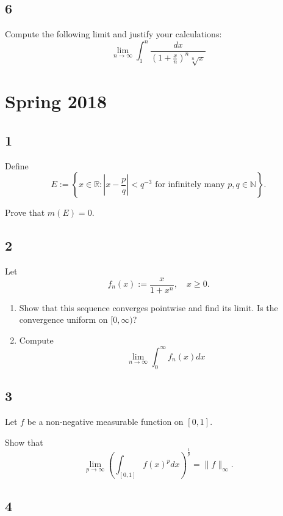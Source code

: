 \hypertarget{section-5}{%
\subsection{6}\label{section-5}}

Compute the following limit and justify your calculations: \[
\lim _{n \rightarrow \infty} \int_{1}^{n} \frac{d x}{\left(1+\frac{x}{n}\right)^{n} \sqrt[n]{x}}
\]

\hypertarget{spring-2018}{%
\section{Spring 2018}\label{spring-2018}}

\hypertarget{section}{%
\subsection{1}\label{section}}

Define \[
E:=\left\{x \in \mathbb{R}:\left|x-\frac{p}{q}\right|<q^{-3} \text { for infinitely many } p, q \in \mathbb{N}\right\}.
\]

Prove that \(m(E) = 0\).

\hypertarget{section-1}{%
\subsection{2}\label{section-1}}

Let \[
f_{n}(x):=\frac{x}{1+x^{n}}, \quad x \geq 0.
\]

\begin{enumerate}
\def\labelenumi{\alph{enumi}.}
\item
  Show that this sequence converges pointwise and find its limit. Is the
  convergence uniform on \([0, \infty)\)?
\item
  Compute \[
  \lim _{n \rightarrow \infty} \int_{0}^{\infty} f_{n}(x) d x
  \]
\end{enumerate}

\hypertarget{section-2}{%
\subsection{3}\label{section-2}}

Let \(f\) be a non-negative measurable function on \([0, 1]\).

Show that \[
\lim _{p \rightarrow \infty}\left(\int_{[0,1]} f(x)^{p} d x\right)^{\frac{1}{p}}=\|f\|_{\infty}.
\]

\hypertarget{section-3}{%
\subsection{4}\label{section-3}}


